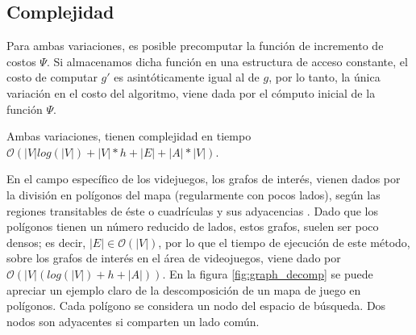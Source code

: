 \documentclass{egpubl}
\newcommand{\bigO}{\mathcal{O}}
\begin{document}
\subsection{Complejidad}

Para ambas variaciones, es posible precomputar la función de
incremento de costos $\Psi$. Si almacenamos dicha función en
una estructura de acceso constante, el costo de computar $g'$
es asintóticamente igual al de $g$, por lo tanto, la única
variación en el costo del algoritmo, viene dada por el
cómputo inicial de la función $\Psi$.

Ambas variaciones, tienen complejidad en tiempo
$\bigO(|V|log(|V|) + |V|*h + |E| + |A|*|V| )$.

En el campo específico de los videjuegos, los grafos
de interés, vienen dados por la división en polígonos
del mapa
\cite{MF09} \cite{CS11}
(regularmente con pocos lados), según las
regiones transitables de éste o cuadrículas y sus
adyacencias \cite{MF09} \cite{CS11}.
Dado que los polígonos tienen un número
reducido de lados, estos grafos, suelen ser poco densos;
es decir, $|E| \in \bigO(|V|)$, por lo que el tiempo
de ejecución de este método, sobre los grafos de interés
en el área de videojuegos, viene dado por
$\bigO(|V|(log(|V|) + h + |A|) )$. En la figura
\ref{fig:graph_decomp} se puede apreciar un ejemplo
claro de la descomposición de un mapa de juego en polígonos.
Cada polígono se considera un nodo del espacio de búsqueda.
Dos nodos son adyacentes si comparten un lado común.
\end{document}
